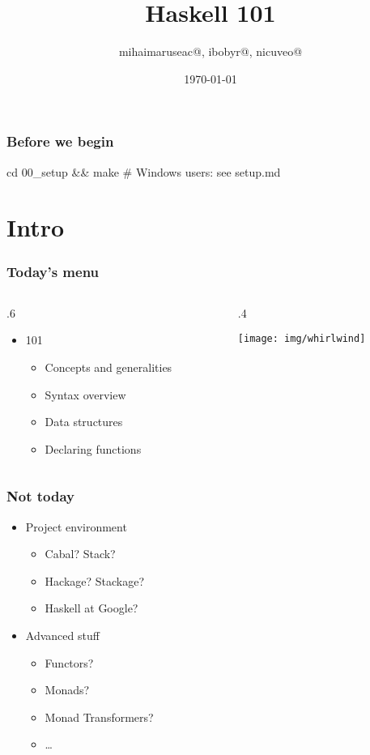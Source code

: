 \documentclass[17pt]{beamer}
\title{Haskell 101}
\author{mihaimaruseac@, ibobyr@, nicuveo@}
\date{\small\today}
\renewcommand{\(}[1]{\begin{columns}[#1]}
\renewcommand{\)}{\end{columns}}
\newcommand{\<}[1]{\begin{column}{#1}}
\renewcommand{\>}{\end{column}}
\begin{document}
\togglefalse{showpagenumber}
\begin{frame}[fragile]
  \frametitle{Before we begin}
  \begin{code}[setup]
cd 00_setup && make
# Windows users: see setup.md
  \end{code}
\end{frame}



\begin{frame}[fragile]
  \titlepage
\end{frame}
\toggletrue{showpagenumber}
\setcounter{framenumber}{0}


\section{Intro}

\begin{frame}
  \frametitle{Today's menu}
  \({c}
  \<{.6\textwidth}
  \begin{center}
  \begin{itemize}
  \item 101
    \begin{itemize}
    \item Concepts and generalities
    \item Syntax overview
    \item Data structures
    \item Declaring functions
    \end{itemize}
  \end{itemize}
  \end{center}
  \>
  \<{.4\textwidth}
  \begin{center}
    \texttt{[image: img/whirlwind]}
  \end{center}
  \>
  \)
\end{frame}

\begin{frame}
  \frametitle{Not today}
  \begin{center}
  \begin{itemize}
  \item Project environment
    \begin{itemize}
    \item Cabal? Stack?
    \item Hackage? Stackage?
    \item Haskell at Google?
    \end{itemize}
  \end{itemize}
  \begin{itemize}
  \item Advanced stuff
    \begin{itemize}
    \item Functors?
    \item Monads?
    \item Monad Transformers?
    \item \ldots
    \end{itemize}
  \end{itemize}
  \end{center}
\end{frame}
\end{document}
